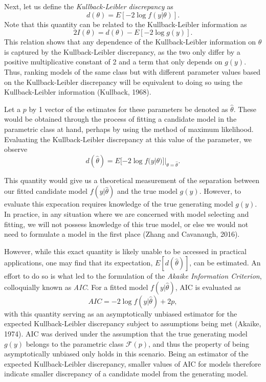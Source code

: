 		Next, let us define the \textit{Kullback-Leibler discrepancy} as
		\begin{equation}
			d(\theta) = E[-2 \log f(y|\theta)] .
		\end{equation}
		Note that this quantity can be related to the Kullback-Leibler information as
		\begin{equation}
			2 I(\theta) = d(\theta) - E \left[ -2 \log g(y) \right].
		\end{equation}
		This relation shows that any dependence of the Kullback-Leibler information on $\theta$ is captured by the Kullback-Leibler discrepancy, as the two only differ by a positive
		multiplicative constant of 2 and a term that only depends on $g(y)$. Thus, ranking models of the same class but with different parameter values based on the Kullback-Leibler
		discrepancy will be equivalent to doing so using the Kullback-Leibler information (Kullback, 1968).
		
		Let a $p$ by 1 vector of the estimates for these parameters be denoted as $\hat{\theta}$. These would be obtained through the process of fitting a candidate model in the
		parametric class at hand, perhaps by using the method of maximum likelihood. Evaluating the Kullback-Leibler discrepancy at this value of the parameter, we observe
		\begin{equation}
			d(\hat{\theta}) = E [ -2 \log f(y | \theta)]|_{\theta = \hat{\theta}}.
		\end{equation}

		This quantity would give us a theoretical measurement of the separation between our fitted candidate model $f(y|\hat{\theta})$ and the true model $g(y)$. However, to
		evaluate this expecation requires knowledge of the true generating model $g(y)$. In practice, in any situation where we are concerned with model selecting and fitting,
		we will not possess knowledge of this true model, or else we would not need to formulate a model in the first place (Zhang and Cavanaugh, 2016).

		However, while this exact quantity is likely unable to be accessed in practical applications, one may find that its expectation, $E[d(\hat{\theta})]$, can be estimated. An
		effort to do so is what led to the formulation of the \textit{Akaike Information Criterion}, colloquially known as \textit{AIC}. For a fitted model $f(y|\hat{\theta})$,
		AIC is evaluated as
		\begin{equation}
			AIC = -2 \log f(y|\hat{\theta}) + 2 p,
		\end{equation}
		with this quantity serving as an asymptotically unbiased estimator for the expected Kullback-Leibler discrepancy subject to assumptions being met (Akaike, 1974). AIC was derived
		under the assumption that the true generating model $g(y)$ belongs to the parametric class $\mathcal{F}(p)$, and thus the property of being asymptotically unbiased only
		holds in this scenario. Being an estimator of the expected Kullback-Leibler discrepancy, smaller values of AIC for models therefore indicate smaller discrepancy of a candidate
		model from the generating model.  

